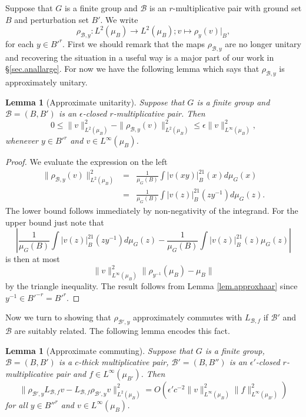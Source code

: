\documentclass[12pt]{amsart}
\numberwithin{equation}{section}
\theoremstyle{plain}
\newtheorem{lemma}[subsection]{Lemma}
\theoremstyle{definition}
\renewcommand{\leq}{\leqslant}
\begin{document}
Suppose that $G$ is a finite group and $\mathcal{B}$ is an $r$-multiplicative pair with ground set $B$ and perturbation set $B'$. We write
\begin{equation*}
\rho_{\mathcal{B},y}:L^2(\mu_B) \rightarrow L^2(\mu_B);v \mapsto \rho_y(v)|_B,
\end{equation*}
for each $y \in B'^r$.  First we should remark that the maps $\rho_{\mathcal{B},y}$ are no longer unitary and recovering the situation in a useful way is a major part of our work in \S\ref{sec.anallarge}.  For now we have the following lemma which says that $\rho_{\mathcal{B},y}$ is approximately unitary.
\begin{lemma}[Approximate unitarity]\label{lem.apun}
Suppose that $G$ is a finite group and $\mathcal{B}=(B,B')$ is an $\epsilon$-closed $r$-multiplicative pair. Then
\begin{equation*}
0 \leq \|v\|_{L^2(\mu_B)}^2 - \|\rho_{\mathcal{B},y}(v)\|_{L^2(\mu_B)}^2 \leq \epsilon\|v\|_{L^\infty(\mu_B)}^2,
\end{equation*}
whenever $y \in B'^r$ and $v \in L^\infty(\mu_B)$.
\end{lemma}
\begin{proof}
We evaluate the expression on the left
\begin{eqnarray*}
\|\rho_{\mathcal{B},y}(v)\|_{L^2(\mu_B)}^2 &=& \frac{1}{\mu_G(B)}\int{|v(xy)|^21_B(x)d\mu_{G}(x)} \\ &= &\frac{1}{\mu_G(B)} \int{|v(z)|^21_B(zy^{-1})d\mu_G(z)}.
\end{eqnarray*}
The lower bound follows immediately by non-negativity of the integrand.  For the upper bound just note that
\begin{equation*}
|\frac{1}{\mu_G(B)} \int{|v(z)|^21_B(zy^{-1})d\mu_G(z)} -\frac{1}{\mu_G(B)} \int{|v(z)|^21_B(z)\mu_G(z)}|\end{equation*}
is then at most
\begin{equation*}
 \|v\|_{L^\infty(\mu_B)}^2\|\rho_{y^{-1}}(\mu_B) - \mu_B\|
\end{equation*}
by the triangle inequality.  The result follows from Lemma \ref{lem.approxhaar} since $y^{-1} \in B'^{-r}=B'^r$.
\end{proof}
Now we turn to showing that $\rho_{\mathcal{B}',y}$ approximately commutes with $L_{\mathcal{B},f}$ if $\mathcal{B}'$ and $\mathcal{B}$ are suitably related. The following lemma encodes this fact.
\begin{lemma}[Approximate commuting]\label{lem.approxtrans}
Suppose that $G$ is a finite group, $\mathcal{B}=(B,B')$ is a $c$-thick multiplicative pair, $\mathcal{B}'=(B,B'')$ is an $\epsilon'$-closed $r$-multiplicative pair and $f \in L^\infty(\mu_{B'})$.  Then
\begin{equation*}
\|\rho_{\mathcal{B}',y}L_{\mathcal{B},f}v - L_{\mathcal{B},f}\rho_{\mathcal{B}',y}v\|_{L^2(\mu_B)}^2=O(\epsilon'c^{-2}\|v\|_{L^\infty(\mu_B)}^2\|f\|_{L^\infty(\mu_{B'})}^2)
\end{equation*}
for all $y \in B''^r$ and $v \in L^\infty(\mu_B)$.
\end{lemma}
\end{document}
